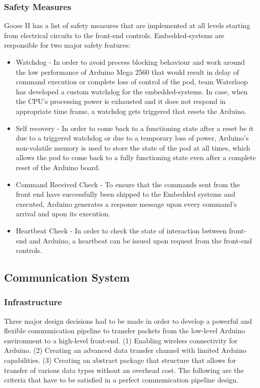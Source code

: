 \documentclass[11pt,a4paper,oldfontcommands]{memoir}
\begin{document}
\subsubsection{Safety Measures}
Goose II has a list of safety measures that are implemented at all levels starting from electrical circuits to the front-end controls. Embedded-systems are responsible for two major safety features:
\begin{itemize}
    \item Watchdog - In order to avoid process blocking behaviour and work around the low performance of Arduino Mega 2560 that would result in delay of command execution or complete loss of control of the pod, team Waterloop has developed a custom watchdog for the embedded-systems. In case, when the CPU's processing power is exhausted and it does not respond in appropriate time frame, a watchdog gets triggered that resets the Arduino.
    \item Self recovery - In order to come back to a functioning state after a reset be it due to a triggered watchdog or due to a temporary loss of power, Arduino's non-volatile memory is used to store the state of the pod at all times, which allows the pod to come back to a fully functioning state even after a complete reset of the Arduino board.
    \item Command Received Check - To ensure that the commands sent from the front end have successfully been shipped to the Embedded systems and executed, Arduino generates a response message upon every command's arrival and upon its execution.
    \item Heartbeat Check - In order to check the state of interaction between front-end and Arduino, a heartbeat can be issued upon request from the front-end controls.
\end{itemize}

\subsection{Communication System}
\subsubsection{Infrastructure}
Three major design decisions had to be made in order to develop a powerful and flexible communication pipeline to transfer packets from the low-level Arduino environment to a high-level front-end. (1) Enabling wireless connectivity for Arduino. (2) Creating an advanced data transfer channel with limited Arduino capabilities. (3) Creating an abstract package that structure that allows for transfer of various data types without an overhead cost. The following are the criteria that have to be satisfied in a perfect communication pipeline design.
\end{document}
